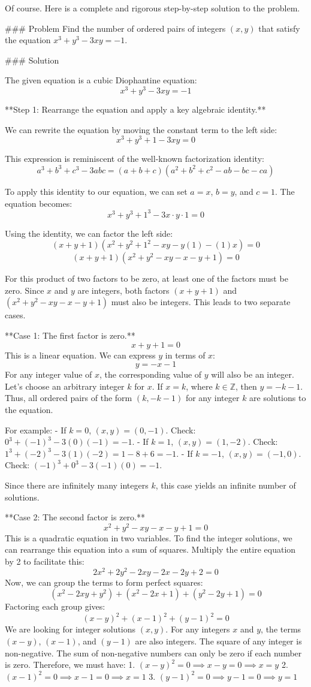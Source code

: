 Of course. Here is a complete and rigorous step-by-step solution to the problem.

### Problem
Find the number of ordered pairs of integers $(x, y)$ that satisfy the equation $x^3 + y^3 - 3xy = -1$.

### Solution

The given equation is a cubic Diophantine equation:
$$x^3 + y^3 - 3xy = -1$$

**Step 1: Rearrange the equation and apply a key algebraic identity.**

We can rewrite the equation by moving the constant term to the left side:
$$x^3 + y^3 + 1 - 3xy = 0$$

This expression is reminiscent of the well-known factorization identity:
$$a^3 + b^3 + c^3 - 3abc = (a+b+c)(a^2+b^2+c^2-ab-bc-ca)$$

To apply this identity to our equation, we can set $a=x$, $b=y$, and $c=1$. The equation becomes:
$$x^3 + y^3 + 1^3 - 3x \cdot y \cdot 1 = 0$$

Using the identity, we can factor the left side:
$$(x+y+1)(x^2+y^2+1^2 - xy - y(1) - (1)x) = 0$$
$$(x+y+1)(x^2+y^2-xy-x-y+1) = 0$$

For this product of two factors to be zero, at least one of the factors must be zero. Since $x$ and $y$ are integers, both factors $(x+y+1)$ and $(x^2+y^2-xy-x-y+1)$ must also be integers. This leads to two separate cases.

**Case 1: The first factor is zero.**
$$x+y+1 = 0$$
This is a linear equation. We can express $y$ in terms of $x$:
$$y = -x - 1$$
For any integer value of $x$, the corresponding value of $y$ will also be an integer. Let's choose an arbitrary integer $k$ for $x$.
If $x = k$, where $k \in \mathbb{Z}$, then $y = -k - 1$.
Thus, all ordered pairs of the form $(k, -k-1)$ for any integer $k$ are solutions to the equation.

For example:
- If $k=0$, $(x,y) = (0, -1)$. Check: $0^3 + (-1)^3 - 3(0)(-1) = -1$.
- If $k=1$, $(x,y) = (1, -2)$. Check: $1^3 + (-2)^3 - 3(1)(-2) = 1 - 8 + 6 = -1$.
- If $k=-1$, $(x,y) = (-1, 0)$. Check: $(-1)^3 + 0^3 - 3(-1)(0) = -1$.

Since there are infinitely many integers $k$, this case yields an infinite number of solutions.

**Case 2: The second factor is zero.**
$$x^2 + y^2 - xy - x - y + 1 = 0$$
This is a quadratic equation in two variables. To find the integer solutions, we can rearrange this equation into a sum of squares. Multiply the entire equation by 2 to facilitate this:
$$2x^2 + 2y^2 - 2xy - 2x - 2y + 2 = 0$$
Now, we can group the terms to form perfect squares:
$$(x^2 - 2xy + y^2) + (x^2 - 2x + 1) + (y^2 - 2y + 1) = 0$$
Factoring each group gives:
$$(x-y)^2 + (x-1)^2 + (y-1)^2 = 0$$
We are looking for integer solutions $(x, y)$. For any integers $x$ and $y$, the terms $(x-y)$, $(x-1)$, and $(y-1)$ are also integers. The square of any integer is non-negative. The sum of non-negative numbers can only be zero if each number is zero.
Therefore, we must have:
1.  $(x-y)^2 = 0 \implies x-y = 0 \implies x=y$
2.  $(x-1)^2 = 0 \implies x-1 = 0 \implies x=1$
3.  $(y-1)^2 = 0 \implies y-1 = 0 \implies y=1$

